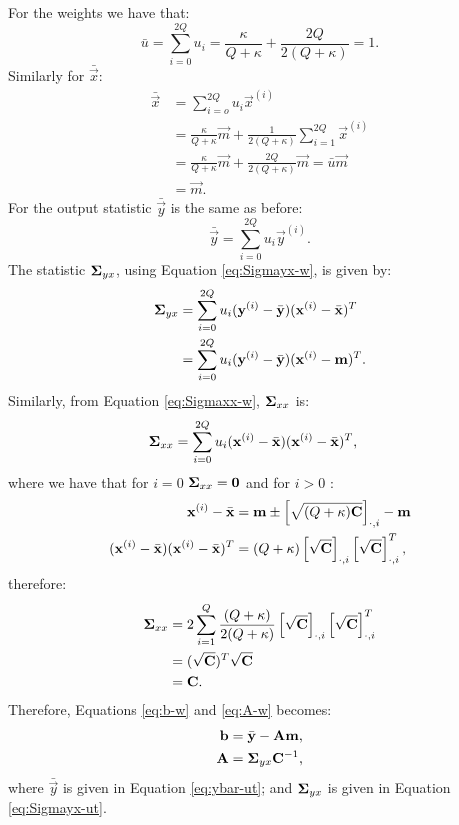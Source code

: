 \documentclass[11pt,a4paper]{article}
\newcommand{\x}{\vec{x}}
\newcommand{\y}{\vec{y}}
\renewcommand{\xi}{\x^{(i)}}
\newcommand{\yi}{\y^{(i)}}
\renewcommand{\b}{\vec{b}}
\newcommand{\xbar}{\bar{\x}}
\newcommand{\ybar}{\bar{\y}}
\newcommand{\Sigmaxx}{\mat{\Sigma}_{xx}}
\newcommand{\Sigmayx}{\mat{\Sigma}_{yx}}
\newcommand{\w}{u}
\newcommand{\wi}{u_i}
\newcommand{\wbar}{\bar{\w}}
\newcommand{\m}{\vec{m}}
\renewcommand{\Q}{Q}
\renewcommand{\k}{\kappa}
\newcommand{\mathcol}[2]{  \left[#1\right]_{\cdot, #2} }
\begin{document}
For the weights we have that:
\begin{equation}
	\wbar = \sum_{i=0}^{2\Q} \wi = \frac{\k}{\Q + \k} + \frac{2\Q}{2 (\Q + \k)} = 1 \text{.}
\end{equation}
Similarly for $\xbar$:
\begin{align}
	\xbar &= \sum_{i=o}^{2\Q} \wi \xi \\
	&= \frac{\k}{\Q + \k} \m + \frac{1}{2(\Q + \k)} \sum_{i=1}^{2\Q} \xi \\
	& = \frac{\k}{\Q + \k} \m + \frac{2 \Q}{2 (\Q + \k)} \m  = \wbar \m  \\
	&= \m.
\end{align}
For the output statistic $\ybar$ is the same as before:
\begin{equation}
	\label{eq:ybar-ut}
	\ybar  =  \sum_{i=0}^{2 \Q} \wi \yi \text{.}
\end{equation}
%
The statistic $\Sigmayx$, using Equation 	\eqref{eq:Sigmayx-w}, is given by:
\begin{align}
	\Sigmayx & = \sum_{i=0}^{2\Q} \wi (\yi - \ybar) (\xi - \xbar)^T \\
	\label{eq:Sigmayx-ut}
	& = \sum_{i=0}^{2\Q} \wi (\yi - \ybar) (\xi - \m)^T \text{.}
\end{align}
Similarly, from Equation \eqref{eq:Sigmaxx-w}, $\Sigmaxx$ is:
\begin{align}
\Sigmaxx & = \sum_{i=0}^{2 \Q} \wi (\xi - \xbar) (\xi - \xbar)^T \text{,}
\end{align}
where we have that for $i=0$ $\Sigmaxx = \mat{0}$ and for $i >0$ :
\begin{align}
	\xi - \xbar & = \m \pm   \mathcol{\sqrt{(\Q + \k) \C}}{i} - \m \\
 	(\xi - \xbar) (\xi - \xbar)^T & = (\Q + \k)  \mathcol{\sqrt{\C}}{i}  \mathcol{\sqrt{\C}}{i}^T \text{,}
\end{align}
therefore:
\begin{align}
	\Sigmaxx & = 2 \sum_{i=1}^{\Q}  \frac{(\Q + \k)}{2 (\Q + \k)} \mathcol{\sqrt{\C}}{i}  \mathcol{\sqrt{\C}}{i}^T\\
	&= (\sqrt{\C})^T  \sqrt{\C} \\
	& = \C \text{.}
\end{align}
Therefore, Equations \eqref{eq:b-w} and  \eqref{eq:A-w} becomes:
\begin{align}
	\b &= \ybar - \A \m \text{,} \\
	\A &= \Sigmayx \C^{-1} 
	\text{,}
\end{align}
where $\ybar$ is given in Equation \eqref{eq:ybar-ut}; and 
$\Sigmayx$ is given in Equation  \eqref{eq:Sigmayx-ut}. 
\end{document}

